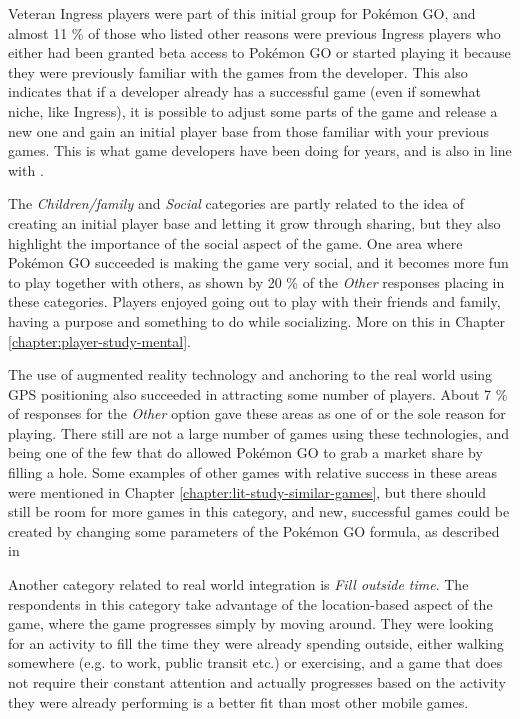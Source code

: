 Veteran Ingress players were part of this initial group for Pokémon GO, and almost 11 \% of those who listed other reasons were previous Ingress players who either had been granted beta access to Pokémon GO or started playing it because they were previously familiar with the games from the developer. This also indicates that if a developer already has a successful game (even if somewhat niche, like Ingress), it is possible to adjust some parts of the game and release a new one and gain an initial player base from those familiar with your previous games. This is what game developers have been doing for years, and is also in line with .

The \emph{Children/family} and \emph{Social} categories are partly related to the idea of creating an initial player base and letting it grow through sharing, but they also highlight the importance of the social aspect of the game. One area where Pokémon GO succeeded is making the game very social, and it becomes more fun to play together with others, as shown by 20 \% of the \emph{Other} responses placing in these categories. Players enjoyed going out to play with their friends and family, having a purpose and something to do while socializing. More on this in Chapter \ref{chapter:player-study-mental}. 

The use of augmented reality technology and anchoring to the real world using GPS positioning also succeeded in attracting some number of players. About 7 \% of responses for the \emph{Other} option gave these areas as one of or the sole reason for playing. There still are not a large number of games using these technologies, and being one of the few that do allowed Pokémon GO to grab a market share by filling a hole. Some examples of other games with relative success in these areas were mentioned in Chapter \ref{chapter:lit-study-similar-games}, but there should still be room for more games in this category, and new, successful games could be created by changing some parameters of the Pokémon GO formula, as described in 

Another category related to real world integration is \emph{Fill outside time}. The respondents in this category take advantage of the location-based aspect of the game, where the game progresses simply by moving around. They were looking for an activity to fill the time they were already spending outside, either walking somewhere (e.g. to work, public transit etc.) or exercising, and a game that does not require their constant attention and actually progresses based on the activity they were already performing is a better fit than most other mobile games.

